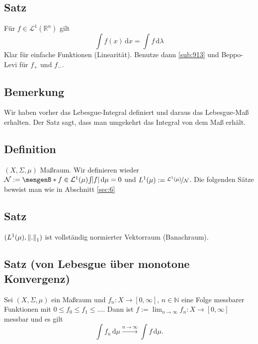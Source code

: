 \subsection[Satz: Das Lebesgue-Maß definiert das Lebesgue-Integral!]{Satz} %
\label{sub:918}
Für $f \in \mathcal{L}^1(\mathds{R}^n)$ gilt
\[
	\int\! f(x)  \, \mathrm{d}x  = \int\! f  \, \mathrm{d}\lambda 
\]
Klar für einfache Funktionen (Linearität). Benutze dann \ref{sub:913} und Beppo-Levi für $f_+$ und $f_-$. \bewende

\subsection[Bemerkung: Aussage von Satz \ref{sub:918}]{Bemerkung} %
\label{sub:919}
Wir haben vorher das Lebesgue-Integral definiert und daraus das Lebesgue-Maß erhalten. Der Satz sagt, dass man umgekehrt das Integral von dem Maß erhält.

\subsection[Definition: Quotientenvektorraum $L^1(\mu)$]{Definition} %
\label{sub:920}
$(X, \Sigma, \mu)$ Maßraum. Wir definieren wieder $\mathcal{N} := \set[f \in \mathcal{L}^1(\mu)]{\int\! \abs*{f}  \, \mathrm{d}\mu = 0 } $ und $L^1(\mu) := \nicefrac{\mathcal{L}^1(\mu)}{\mathcal{N}}$.
\bigskip
Die folgenden Sätze beweist man wie in Abschnitt \ref{sec:6}

\subsection[Satz: $L^1(\mu)$ ist ein Banachraum]{Satz} %
\label{sub:921}
$(L^1(\mu), \norm[1]{.} )$ ist vollständig normierter Vektorraum (Banachraum).

\subsection{Satz (von Lebesgue über monotone Konvergenz)} %
\label{sub:922}
Sei $(X, \Sigma, \mu)$ ein Maßraum und $f_n : X \to [0,\infty]$, $n \in \mathds{N}$ eine Folge messbarer Funktionen mit $0 \le f_0 \le f_1 \le \ldots $. Dann ist 
$f := \lim_{ n \to \infty} f_n : X \to [0,\infty]$ messbar und es gilt
\[
	\int\! f_n  \, \mathrm{d}\mu \xrightarrow{n \to \infty} \int\! f  \, \mathrm{d}\mu.
\]


